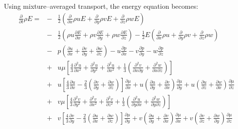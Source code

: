 \documentclass[dvips]{article}
\begin{document}
\newpage
\noindent
Using mixture--averaged transport, the energy equation becomes:
\begin{eqnarray}
\frac{\partial}{\partial t}\rho E =
& - & \frac{1}{2}\left(
 \frac{\partial}{\partial x}\rho u E 
+\frac{\partial}{\partial y}\rho v E 
+\frac{\partial}{\partial z}\rho w E
                 \right) \nonumber\\
& - & \frac{1}{2}\left(
 \rho u\frac{\partial E}{\partial x}
+\rho v\frac{\partial E}{\partial y}
+\rho w\frac{\partial E}{\partial z}
                 \right)
-\frac{1}{2}E\left(
 \frac{\partial}{\partial x}\rho u
+\frac{\partial}{\partial y}\rho v
+\frac{\partial}{\partial z}\rho w
             \right) \nonumber\\
& - & p\left(
 \frac{\partial u}{\partial x}
+\frac{\partial v}{\partial y}
+\frac{\partial w}{\partial z}
             \right)
- u\frac{\partial p}{\partial x}
- v\frac{\partial p}{\partial y}
- w\frac{\partial p}{\partial z} \nonumber\\
& + & u\mu\left[
\frac{4}{3}\frac{\partial^{2}u}{\partial x^{2}}
          +\frac{\partial^{2}u}{\partial y^{2}}
          +\frac{\partial^{2}u}{\partial x^{2}}
+\frac{1}{3}\left(
 \frac{\partial^{2}v}{\partial x\partial y}
+\frac{\partial^{2}w}{\partial x\partial z}
            \right)
\right]\nonumber\\
& + & u\left[
\frac{4}{3}\frac{\partial u}{\partial x}
-\frac{2}{3}\left(
 \frac{\partial v}{\partial y}
+\frac{\partial w}{\partial z}
            \right)
      \right]\frac{\partial \mu}{\partial x}
+u\left(
 \frac{\partial u}{\partial y}
+\frac{\partial v}{\partial x}
 \right)\frac{\partial \mu}{\partial y}
+u\left(
 \frac{\partial u}{\partial z}
+\frac{\partial w}{\partial x}
 \right)\frac{\partial \mu}{\partial z}\nonumber\\
& + & v\mu\left[
\frac{4}{3}\frac{\partial^{2}v}{\partial y^{2}}
          +\frac{\partial^{2}v}{\partial x^{2}}
          +\frac{\partial^{2}v}{\partial z^{2}}
+\frac{1}{3}\left(
 \frac{\partial^{2}u}{\partial y\partial x}
+\frac{\partial^{2}w}{\partial y\partial z}
            \right)
\right]\nonumber\\
& + & v\left[
\frac{4}{3}\frac{\partial v}{\partial y}
-\frac{2}{3}\left(
 \frac{\partial u}{\partial x}
+\frac{\partial w}{\partial z}
            \right)
      \right]\frac{\partial \mu}{\partial y}
+v\left(
 \frac{\partial u}{\partial y}
+\frac{\partial v}{\partial x}
 \right)\frac{\partial \mu}{\partial x}
+v\left(
 \frac{\partial v}{\partial z}
+\frac{\partial w}{\partial y}
 \right)\frac{\partial \mu}{\partial z}\nonumber\\

\end{eqnarray}
\end{document}

